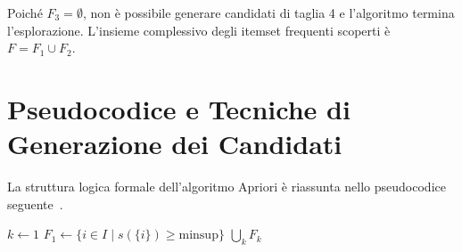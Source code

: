 Poiché $F_3 = \emptyset$, non è possibile generare candidati di taglia 4 e l'algoritmo termina l'esplorazione. L'insieme complessivo degli itemset frequenti scoperti è $F = F_1 \cup F_2$.

\FloatBarrier
\section{Pseudocodice e Tecniche di Generazione dei Candidati}
\label{sec:dm-candidate-generation-methods}

La struttura logica formale dell'algoritmo Apriori è riassunta nello pseudocodice seguente~\cite{agrawal1994, tan2018}.

\begin{algorithm}[htbp]
\SetAlgoLined
\caption{Algoritmo Apriori per l'Estrazione degli Itemset Frequenti}
\label{alg:dm-apriori}
\KwInput{Database transazionale $T$, soglia minima di supporto $\mathrm{minsup} \in (0, 1]$.}
\BlankLine
$k \leftarrow 1$\;
$F_1 \leftarrow \{ i \in I \mid s(\{i\}) \ge \mathrm{minsup} \}$ 
\Return $\bigcup_k F_k$\;
\end{algorithm}

\FloatBarrier

